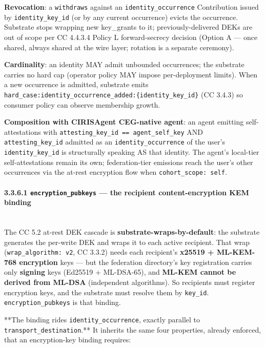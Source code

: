 \documentclass[11pt]{article}
\begin{document}
\textbf{Revocation}: a \texttt{withdraws} against an \texttt{identity\_occurrence} Contribution issued by \texttt{identity\_key\_id} (or by any current occurrence) evicts the occurrence. Substrate stops wrapping new key\_grants to it; previously-delivered DEKs are out of scope per CC 4.4.3.4 Policy L forward-secrecy decision (Option A — once shared, always shared at the wire layer; rotation is a separate ceremony).


\textbf{Cardinality}: an identity MAY admit unbounded occurrences; the substrate carries no hard cap (operator policy MAY impose per-deployment limits). When a new occurrence is admitted, substrate emits \texttt{hard\_case:identity\_occurrence\_added:\{identity\_key\_id\}} (CC 3.4.3) so consumer policy can observe membership growth.


\textbf{Composition with CIRISAgent CEG-native agent}: an agent emitting self-attestations with \texttt{attesting\_key\_id == agent\_self\_key} AND \texttt{attesting\_key\_id} admitted as an \texttt{identity\_occurrence} of the user's \texttt{identity\_key\_id} is structurally speaking AS that identity. The agent's local-tier self-attestations remain its own; federation-tier emissions reach the user's other occurrences via the at-rest encryption flow when \texttt{cohort\_scope: self}.


\paragraph{3.3.6.1 \texttt{encryption\_pubkeys} — the recipient content-encryption KEM binding}\mbox{}\\


The CC 5.2 at-rest DEK cascade is \textbf{substrate-wraps-by-default}: the substrate generates the per-write DEK and wraps it to each active recipient. That wrap (\texttt{wrap\_algorithm: v2}, CC 3.3.2) needs each recipient's \textbf{x25519 + ML-KEM-768 encryption} keys — but the federation directory's key registration carries only \textbf{signing} keys (Ed25519 + ML-DSA-65), and \textbf{ML-KEM cannot be derived from ML-DSA} (independent algorithms). So recipients must register encryption keys, and the substrate must resolve them by \texttt{key\_id}. \texttt{encryption\_pubkeys} is that binding.


**The binding rides \texttt{identity\_occurrence}, exactly parallel to \texttt{transport\_destination}.** It inherits the same four properties, already enforced, that an encryption-key binding requires:
\end{document}
